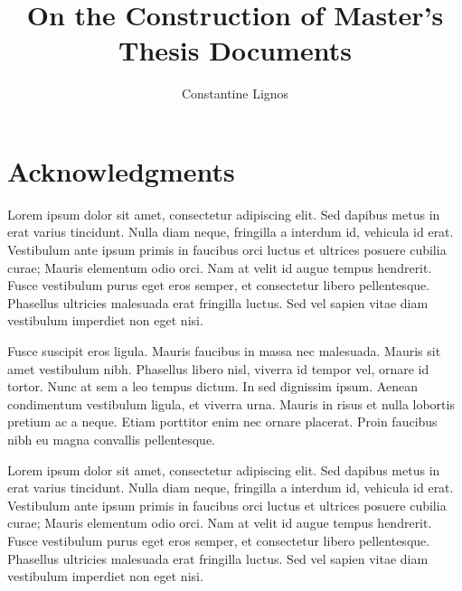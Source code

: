 \documentclass{brandeis-thesis3.2}
\title{On the Construction of Master's Thesis Documents}
\author{Constantine Lignos}
\begin{document}
\maketitlepage

\chapter*{Acknowledgments}

\begin{doublespacing}

Lorem ipsum dolor sit amet, consectetur adipiscing elit. Sed dapibus metus in erat varius tincidunt. Nulla diam neque, fringilla a interdum id, vehicula id erat. Vestibulum ante ipsum primis in faucibus orci luctus et ultrices posuere cubilia curae; Mauris elementum odio orci. Nam at velit id augue tempus hendrerit. Fusce vestibulum purus eget eros semper, et consectetur libero pellentesque. Phasellus ultricies malesuada erat fringilla luctus. Sed vel sapien vitae diam vestibulum imperdiet non eget nisi.

Fusce suscipit eros ligula. Mauris faucibus in massa nec malesuada. Mauris sit amet vestibulum nibh. Phasellus libero nisl, viverra id tempor vel, ornare id tortor. Nunc at sem a leo tempus dictum. In sed dignissim ipsum. Aenean condimentum vestibulum ligula, et viverra urna. Mauris in risus et nulla lobortis pretium ac a neque. Etiam porttitor enim nec ornare placerat. Proin faucibus nibh eu magna convallis pellentesque.

\end{doublespacing}

\clearpage

\begin{thesis-abstract}
Lorem ipsum dolor sit amet, consectetur adipiscing elit. Sed dapibus metus in erat varius tincidunt. Nulla diam neque, fringilla a interdum id, vehicula id erat. Vestibulum ante ipsum primis in faucibus orci luctus et ultrices posuere cubilia curae; Mauris elementum odio orci. Nam at velit id augue tempus hendrerit. Fusce vestibulum purus eget eros semper, et consectetur libero pellentesque. Phasellus ultricies malesuada erat fringilla luctus. Sed vel sapien vitae diam vestibulum imperdiet non eget nisi.

\end{thesis-abstract}

\end{document}
